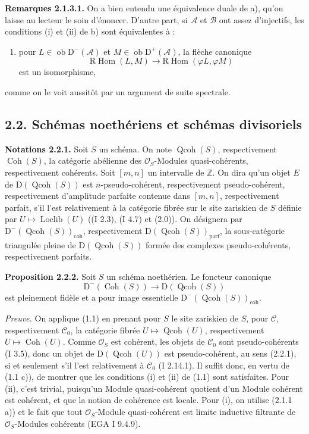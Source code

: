 \documentclass[11pt]{article}
\providecommand{\Loclib}{\operatorname{Loclib}}
\providecommand{\Qcoh}{\operatorname{Qcoh}}
\providecommand{\Coh}{\operatorname{Coh}}
\providecommand{\Ob}{\operatorname{ob}}
\providecommand{\coh}{\operatorname{coh}}
\providecommand{\parf}{\operatorname{parf}}
\begin{document}
\textbf{Remarques 2.1.3.1.} On a bien entendu une équivalence duale de a), qu'on laisse au lecteur le soin d'énoncer. D'autre part, si $\mathcal A$ et $\mathcal B$ ont assez d'injectifs, les conditions (i) et (ii) de b) sont équivalentes à :
\begin{enumerate}[label=(\roman*),start=3]
\item pour $L\in\Ob\mathrm D^{-}(\mathcal A)$ et $M\in\Ob\mathrm D^{+}(\mathcal A)$, la flèche canonique
\[
\mathrm R\!\operatorname{Hom}(L,M)\longrightarrow
\mathrm R\!\operatorname{Hom}(\varphi L,\varphi M)
\]
est un isomorphisme,
\end{enumerate}
comme on le voit aussitôt par un argument de suite spectrale.

\subsection*{2.2. Schémas noethériens et schémas divisoriels}

\textbf{Notations 2.2.1.} Soit $S$ un schéma. On note $\Qcoh(S)$, respectivement $\Coh(S)$, la catégorie abélienne des $\mathcal O_S$-Modules quasi-cohérents, respectivement cohérents. Soit $[m,n]$ un intervalle de $\mathbb Z$. On dira qu'un objet $E$ de $\mathrm D(\Qcoh(S))$ est $n$-pseudo-cohérent, respectivement pseudo-cohérent, respectivement d'amplitude parfaite contenue dans $[m,n]$, respectivement parfait, s'il l'est relativement à la catégorie fibrée sur le site zariskien de $S$ définie par $U\mapsto\Loclib(U)$ ((I 2.3), (I 4.7) et (2.0)). On désignera par $\mathrm D^{-}(\Qcoh(S))_{\coh}$, respectivement $\mathrm D(\Qcoh(S))_{\parf}$, la sous-catégorie triangulée pleine de $\mathrm D(\Qcoh(S))$ formée des complexes pseudo-cohérents, respectivement parfaits.

\textbf{Proposition 2.2.2.} Soit $S$ un schéma noethérien. Le foncteur canonique
\[
\mathrm D^{-}(\Coh(S))\longrightarrow \mathrm D(\Qcoh(S))
\]
est pleinement fidèle et a pour image essentielle $\mathrm D^{-}(\Qcoh(S))_{\coh}$.

\emph{Preuve.} On applique (1.1) en prenant pour $S$ le site zariskien de $S$, pour $\mathcal C$, respectivement $\mathcal C_0$, la catégorie fibrée $U\mapsto\Qcoh(U)$, respectivement $U\mapsto\Coh(U)$. Comme $\mathcal O_S$ est cohérent, les objets de $\mathcal C_0$ sont pseudo-cohérents (I 3.5), donc un objet de $\mathrm D(\Qcoh(U))$ est pseudo-cohérent, au sens (2.2.1), si et seulement s'il l'est relativement à $\mathcal C_0$ (I 2.14.1). Il suffit donc, en vertu de (1.1 c)), de montrer que les conditions (i) et (ii) de (1.1) sont satisfaites. Pour (ii), c'est trivial, puisqu'un Module quasi-cohérent quotient d'un Module cohérent est cohérent, et que la notion de cohérence est locale. Pour (i), on utilise (2.1.1 a)) et le fait que tout $\mathcal O_S$-Module quasi-cohérent est limite inductive filtrante de $\mathcal O_S$-Modules cohérents (EGA I 9.4.9).
\end{document}
